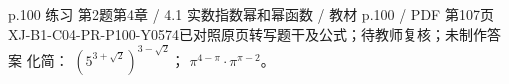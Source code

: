 \par\noindent\begin{minipage}{\linewidth}
\begin{bankitem}{p.100 练习 第2题}{第4章 / 4.1 实数指数幂和幂函数 / 教材 p.100 / PDF 第107页}{XJ-B1-C04-PR-P100-Y0574}{已对照原页转写题干及公式；待教师复核；未制作答案}
化简：
$\left(5^{3+\sqrt2}\right)^{3-\sqrt2}$；
$\pi^{4-\pi}\cdot\pi^{\pi-2}$。
\end{bankitem}
\end{minipage}\par\medskip
